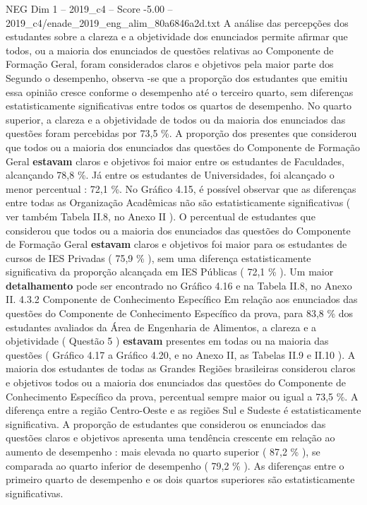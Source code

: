 \begin{textsample}{NEG Dim 1 – 2019\_c4 – Score -5.00 – 2019\_c4/enade\_2019\_eng\_alim\_80a6846a2d.txt}
A análise das percepções dos estudantes sobre a clareza e a objetividade dos enunciados permite afirmar que todos, ou a maioria dos enunciados de questões relativas ao Componente de Formação Geral, foram considerados claros e objetivos pela maior parte dos Segundo o desempenho, observa -se que a proporção dos estudantes que emitiu essa opinião cresce conforme o desempenho até o terceiro quarto, sem diferenças estatisticamente significativas entre todos os quartos de desempenho.
No quarto superior, a clareza e a objetividade de todos ou da maioria dos enunciados das questões foram percebidas por 73,5 \%.
A proporção dos presentes que considerou que todos ou a maioria dos enunciados das questões do Componente de Formação Geral \textbf{estavam} claros e objetivos foi maior entre os estudantes de Faculdades, alcançando 78,8 \%.
Já entre os estudantes de Universidades, foi alcançado o menor percentual : 72,1 \%.
No Gráfico 4.15, é possível observar que as diferenças entre todas as Organização Acadêmicas não são estatisticamente significativas ( ver também Tabela II.8, no Anexo II ).
O percentual de estudantes que considerou que todos ou a maioria dos enunciados das questões do Componente de Formação Geral \textbf{estavam} claros e objetivos foi maior para os estudantes de cursos de IES Privadas ( 75,9 \% ), sem uma diferença estatisticamente significativa da proporção alcançada em IES Públicas ( 72,1 \% ).
Um maior \textbf{detalhamento} pode ser encontrado no Gráfico 4.16 e na Tabela II.8, no Anexo II. 4.3.2 Componente de Conhecimento Específico Em relação aos enunciados das questões do Componente de Conhecimento Específico da prova, para 83,8 \% dos estudantes avaliados da Área de Engenharia de Alimentos, a clareza e a objetividade ( Questão 5 ) \textbf{estavam} presentes em todas ou na maioria das questões ( Gráfico 4.17 a Gráfico 4.20, e no Anexo II, as Tabelas II.9 e II.10 ).
A maioria dos estudantes de todas as Grandes Regiões brasileiras considerou claros e objetivos todos ou a maioria dos enunciados das questões do Componente de Conhecimento Específico da prova, percentual sempre maior ou igual a 73,5 \%.
A diferença entre a região Centro-Oeste e as regiões Sul e Sudeste é estatisticamente significativa.
A proporção de estudantes que considerou os enunciados das questões claros e objetivos apresenta uma tendência crescente em relação ao aumento de desempenho : mais elevada no quarto superior ( 87,2 \% ), se comparada ao quarto inferior de desempenho ( 79,2 \% ).
As diferenças entre o primeiro quarto de desempenho e os dois quartos superiores são estatisticamente significativas.

\end{textsample}
